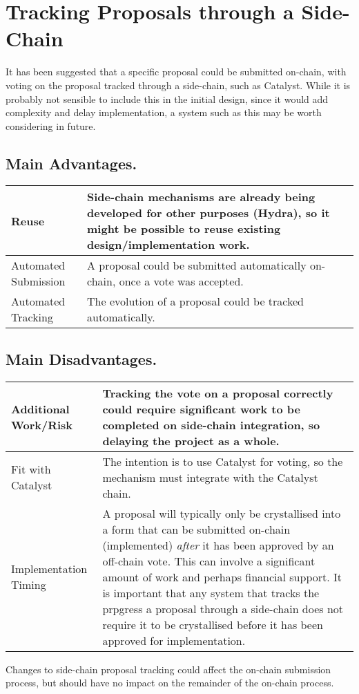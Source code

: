 \section{Tracking Proposals through a Side-Chain}

It has been suggested that a specific proposal could be submitted on-chain, with voting on the proposal tracked through a side-chain, such as Catalyst.
While it is probably not sensible to include this in the initial design, since it would add complexity and delay implementation, a system such as this
may be worth considering in future.

\subsection*{Main Advantages.}

\begin{tabular}{||l|p{4.5in}||}
  \hline\hline
  Reuse
  & Side-chain mechanisms are already being developed for other purposes (Hydra), so it might be possible to reuse existing design/implementation work.
  \\ \hline
  Automated Submission
  & A proposal could be submitted automatically on-chain, once a vote was accepted.
  \\ \hline
  Automated Tracking
  & The evolution of a proposal could be tracked automatically.
  \\ \hline
  \hline
\end{tabular}

\subsection*{Main Disadvantages.}

\begin{tabular}{||l|p{4.5in}||}
  \hline\hline
  Additional Work/Risk &
  Tracking the vote on a proposal correctly could require significant work to be completed on side-chain integration, so delaying the project as a whole.
  \\\hline
  Fit with Catalyst &
  The intention is to use Catalyst for voting, so the mechanism must integrate with the Catalyst chain.
  \\\hline
  Implementation Timing & A proposal will typically only be crystallised into a form that can be submitted on-chain (implemented) \emph{after} it has been approved by an off-chain vote.
  This can involve a significant amount of work and perhaps financial support.
  It is important that any system that tracks the prpgress a proposal through a side-chain does not require it to be crystallised before it has been approved for implementation.
  \\ \hline
  \hline
\end{tabular}

Changes to side-chain proposal tracking could affect the on-chain submission process, but should have no impact on the remainder of the on-chain process.
